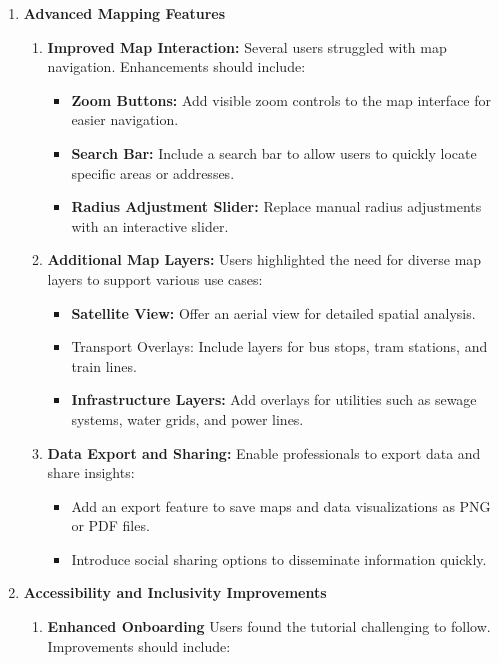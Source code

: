\begin{enumerate}
    \item \textbf{Advanced Mapping Features}
    \begin{enumerate}
        \item \textbf{Improved Map Interaction:}
        Several users struggled with map navigation. Enhancements should include:
        \begin{itemize}
            \item \textbf{Zoom Buttons:} Add visible zoom controls to the map interface for easier navigation.
            \item \textbf{Search Bar:} Include a search bar to allow users to quickly locate specific areas or addresses.
            \item \textbf{Radius Adjustment Slider:} Replace manual radius adjustments with an interactive slider.
        \end{itemize}
        \item \textbf{Additional Map Layers:}
        Users highlighted the need for diverse map layers to support various use cases:
        \begin{itemize}
            \item \textbf{Satellite View:} Offer an aerial view for detailed spatial analysis.
            \item Transport Overlays: Include layers for bus stops, tram stations, and train lines.
            \item \textbf{Infrastructure Layers:} Add overlays for utilities such as sewage systems, water grids, and power lines.
        \end{itemize}
        \item \textbf{Data Export and Sharing:}
        Enable professionals to export data and share insights:
        \begin{itemize}
            \item Add an export feature to save maps and data visualizations as PNG or PDF files.
            \item Introduce social sharing options to disseminate information quickly.
        \end{itemize}
    \end{enumerate}
    \item \textbf{Accessibility and Inclusivity Improvements}
    \begin{enumerate}
        \item \textbf{Enhanced Onboarding}
        Users found the tutorial challenging to follow. Improvements should include:

\end{enumerate}
\end{enumerate}
